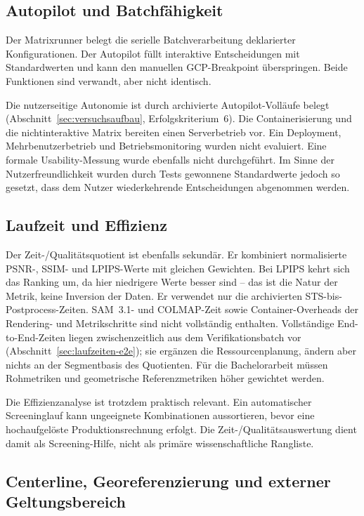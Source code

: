\subsection{Autopilot und Batchfähigkeit}

Der Matrixrunner belegt die serielle Batchverarbeitung deklarierter
Konfigurationen. Der Autopilot füllt interaktive Entscheidungen mit
Standardwerten und kann den manuellen GCP-Breakpoint überspringen. Beide
Funktionen sind verwandt, aber nicht identisch.

Die nutzerseitige Autonomie ist durch archivierte Autopilot-Volläufe belegt
(Abschnitt~\ref{sec:versuchsaufbau}, Erfolgskriterium~6). Die
Containerisierung und die nichtinteraktive Matrix bereiten einen Serverbetrieb
vor. Ein Deployment, Mehrbenutzerbetrieb und Betriebsmonitoring wurden nicht
evaluiert. Eine formale Usability-Messung wurde ebenfalls nicht durchgeführt.
Im Sinne der Nutzerfreundlichkeit wurden durch Tests gewonnene Standardwerte
jedoch so gesetzt, dass dem Nutzer wiederkehrende Entscheidungen abgenommen
werden.

\subsection{Laufzeit und Effizienz}

Der Zeit-/Qualitätsquotient ist ebenfalls sekundär. Er kombiniert normalisierte
PSNR-, SSIM- und LPIPS-Werte mit gleichen Gewichten. Bei LPIPS kehrt sich das
Ranking um, da hier niedrigere Werte besser sind – das ist die Natur der
Metrik, keine Inversion der Daten. Er verwendet
nur die archivierten STS-bis-Postprocess-Zeiten. SAM~3.1- und COLMAP-Zeit sowie
Container-Overheads der Rendering- und Metrikschritte sind nicht vollständig
enthalten. Vollständige End-to-End-Zeiten liegen zwischenzeitlich aus dem
Verifikationsbatch  vor
(Abschnitt~\ref{sec:laufzeiten-e2e}); sie ergänzen die Ressourcenplanung,
ändern aber nichts an der Segmentbasis des Quotienten. Für die
Bachelorarbeit müssen Rohmetriken und geometrische
Referenzmetriken höher gewichtet werden.

Die Effizienzanalyse ist trotzdem praktisch relevant. Ein automatischer
Screeninglauf kann ungeeignete Kombinationen aussortieren, bevor eine
hochaufgelöste Produktionsrechnung erfolgt. Die Zeit-/Qualitätsauswertung
dient damit als Screening-Hilfe, nicht als primäre wissenschaftliche
Rangliste.

\subsection{Centerline, Georeferenzierung und externer Geltungsbereich}

